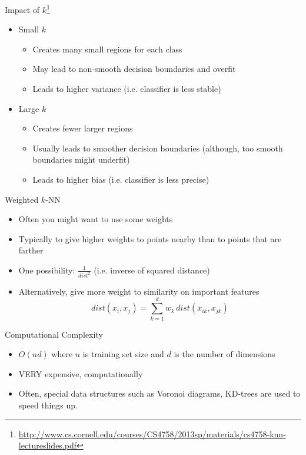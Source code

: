\documentclass{beamer}
\newcommand{\furl}[1]{{\footnote{\url{#1}}}}
\begin{document}
\begin{frame}{Impact of $k$\furl{http://www.cs.cornell.edu/courses/CS4758/2013sp/materials/cs4758-knn-lectureslides.pdf}}
    \begin{itemize}
        \item Small $k$
            \begin{itemize}
                \item Creates many small regions for each class
                \item May lead to non-smooth decision boundaries and overfit
                \item Leads to higher variance (i.e. classifier is less stable)
            \end{itemize}
        \item Large $k$ 
            \begin{itemize}
                \item Creates fewer larger regions
                \item Usually leads to smoother decision boundaries (although, too smooth boundaries might underfit)
                \item Leads to higher bias (i.e. classifier is less precise)
            \end{itemize}
    \end{itemize}
\end{frame}

\begin{frame}{Weighted $k$-NN}
    \begin{itemize}
        \item Often you might want to use some weights
        \item Typically to give higher weights to points nearby than to points that are farther
        \item One possibility: $\frac{1}{dist^2}$ (i.e. inverse of squared distance)
        \item Alternatively, give more weight to similarity on important features $$dist(x_i, x_j) = \sum_{k=1}^{d} w_k \, dist(x_{ik}, x_{jk})$$
    \end{itemize}
\end{frame}




\begin{frame}{Computational Complexity}
    \begin{itemize}
        \item $O(nd)$ where $n$ is training set size and $d$ is the number of dimensions
        \item VERY expensive, computationally
        \item Often, special data structures such as Voronoi diagrams, KD-trees are used to speed things up.
    \end{itemize}
\end{frame}
\end{document}
